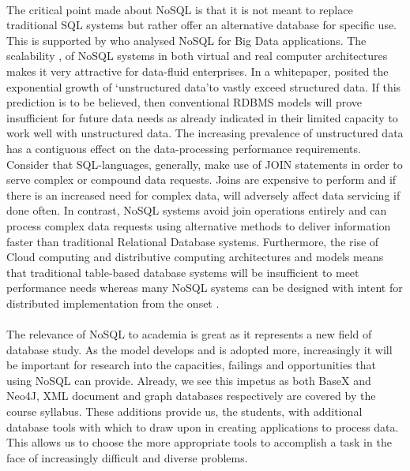 \documentclass[12pt]{article}
\begin{document}
\paragraph{}
The critical point made about NoSQL is that it is not meant to replace traditional SQL systems but rather offer an alternative database for specific use. This is supported by \cite{hossain13} who analysed NoSQL for Big Data applications. The scalability \cite{mcCreary14},  of NoSQL systems in both virtual and real computer architectures makes it very attractive for data-fluid enterprises. In a whitepaper, \citep{couch16} posited the exponential growth of \lq unstructured data\rq  to vastly exceed structured data. If this prediction is to be believed, then conventional RDBMS models will prove insufficient for future data needs as already indicated in their limited capacity to work well with unstructured data. The increasing prevalence of unstructured data has a contiguous effect on the data-processing performance requirements. Consider that SQL-languages, generally, make use of JOIN statements in order to serve complex or compound data requests. Joins are expensive to perform and if there is an increased need for complex data, will adversely affect data servicing if done often. In contrast, NoSQL systems avoid join operations entirely and can process complex data requests using alternative methods to deliver information faster than traditional Relational Database systems. Furthermore, the rise of Cloud computing and distributive computing architectures and models means that traditional table-based database systems will be insufficient to meet performance needs whereas many NoSQL systems can be designed with intent for distributed implementation from the onset \cite{couch16}. 
\paragraph{}
The relevance of NoSQL to academia is great as it represents a new field of database study. As the model develops and is adopted more, increasingly it will be important for research into the capacities, failings and opportunities that using NoSQL can provide. Already, we see this impetus as both BaseX and Neo4J, XML document and graph databases respectively are covered by the course syllabus. These additions provide us, the students, with additional database tools with which to draw upon in creating applications to process data. This allows us to choose the more appropriate tools to accomplish a task in the face of increasingly difficult and diverse problems.
\end{document}

